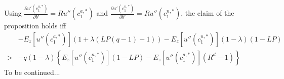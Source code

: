 \documentclass[11pt]{article} %
\begin{document}
Using $\frac{\partial u'(c^{a,*}_1)}{\partial b'} = R u''(c^{a,*}_1)$ and $\frac{\partial u'(c^{n,*}_1)}{\partial b'} = R u''(c^{n,*}_1)$, the claim of the proposition holds iff
\begin{align}
&-E_z[u''(c^{a,*}_1)](1+\lambda(LP(q-1)-1)) - E_z[u''(c^{n,*}_1)](1-\lambda)(1-LP)\nonumber \\> &-q(1-\lambda) \left\{  E_z[u''(c^{n,*}_1)] (1-LP) -E_z[u''(c^{a,*}_1)] (R^d-1) \right\}\label{ineq:toshow}
\end{align}
To be continued...
\end{document}
